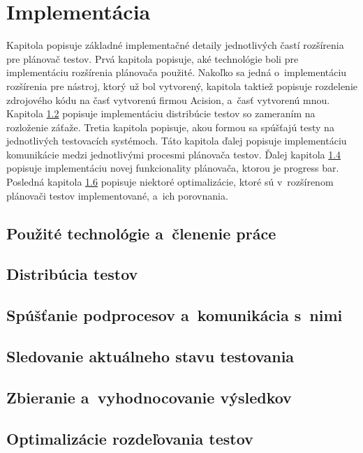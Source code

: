 %
%
\chapter{Implementácia}
Kapitola popisuje základné implementačné detaily jednotlivých častí rozšírenia pre plánovač testov.
Prvá kapitola popisuje, aké technológie boli pre implementáciu rozšírenia plánovača použité.
Nakoľko sa jedná o~implementáciu rozšírenia pre nástroj, ktorý už bol vytvorený, kapitola taktiež popisuje 
rozdelenie zdrojového kódu na časť vytvorenú firmou Acision, a~časť vytvorenú mnou.
Kapitola \ref{sekcia:distribucia_testov} popisuje implementáciu distribúcie testov so zameraním na 
rozloženie záťaže. Tretia kapitola popisuje, akou formou sa spúšťajú testy na jednotlivých testovacích
systémoch. Táto kapitola ďalej popisuje implementáciu komunikácie medzi jednotlivými procesmi plánovača testov.
Ďalej kapitola \ref{sekcia:sledovanie_stavu} popisuje implementáciu novej funkcionality plánovača, ktorou je progress bar.
Posledná kapitola \ref{sekcia:optimalizacie} popisuje niektoré optimalizácie, ktoré sú v~rozšírenom plánovači testov
implementované, a~ich porovnania.

\section{Použité technológie a~členenie práce}

\section{Distribúcia testov}
\label{sekcia:distribucia_testov}

\section{Spúšťanie podprocesov a~komunikácia s~nimi}
\label{sekcia:spustanie_podprocesov}

\section{Sledovanie aktuálneho stavu testovania}
\label{sekcia:sledovanie_stavu}

\section{Zbieranie a~vyhodnocovanie výsledkov}
\label{sekcia:zbieranie_vysledkov}

\section{Optimalizácie rozdeľovania testov}
\label{sekcia:optimalizacie}





